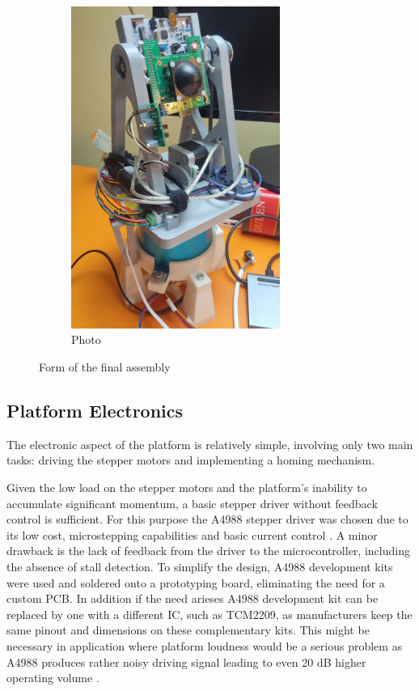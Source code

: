 \begin{figure}[h!]
\begin{subfigure}[b]{0.45\textwidth}
    \includegraphics[width=0.75\textwidth]{../img/assembly_photo.jpg}
    \caption{Photo}
  \end{subfigure}
  \caption{Form of the final assembly}
  \label{fig:side_by_side}
\end{figure}


\subsection{Platform Electronics}

The electronic aspect of the platform is relatively simple, involving only two main tasks: driving the stepper motors and implementing a homing mechanism.

Given the low load on the stepper motors and the platform's inability to accumulate significant momentum, a basic stepper driver without feedback control is sufficient.
For this purpose the A4988 stepper driver was chosen due to its low cost, microstepping capabilities and basic current control \cite{a4988}.
A minor drawback is the lack of feedback from the driver to the microcontroller, including the absence of stall detection.
To simplify the design, A4988 development kits were used and soldered onto a prototyping board, eliminating the need for a custom PCB.
In addition if the need arieses A4988 development kit can be replaced by one with a different IC, such as TCM2209, as manufacturers keep the same pinout and dimensions on these complementary kits.
This might be necessary in application where platform loudness would be a serious problem as A4988 produces rather noisy driving signal leading to even 20 dB higher operating volume \cite{a4988_sound}.


